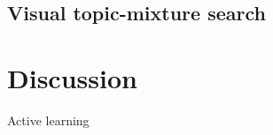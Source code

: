 \subsection{Visual topic-mixture search}

\section{Discussion}
Active learning \citep{Jayaraman2017}


